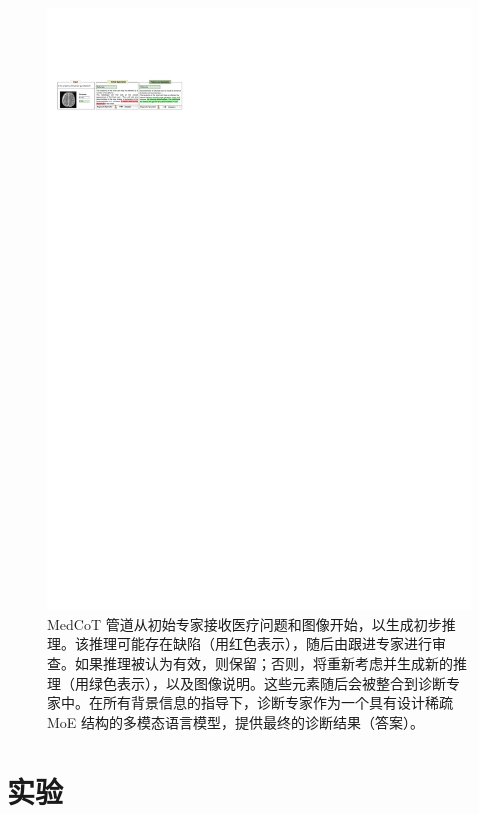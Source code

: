 \documentclass[11pt]{article}
\begin{document}
\begin{figure}
\centering
\includegraphics[width=\textwidth]{image/Figure_case1_v3.pdf}
\caption{
MedCoT 管道从初始专家接收医疗问题和图像开始，以生成初步推理。该推理可能存在缺陷（用红色表示），随后由跟进专家进行审查。如果推理被认为有效，则保留；否则，将重新考虑并生成新的推理（用绿色表示），以及图像说明。这些元素随后会被整合到诊断专家中。在所有背景信息的指导下，诊断专家作为一个具有设计稀疏 MoE 结构的多模态语言模型，提供最终的诊断结果（答案）。
}
\label{case1}
\end{figure}
\section{实验}
\end{document}
